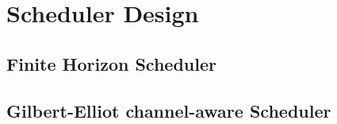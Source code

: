 \chapter{Scheduler Design}

\section{Finite Horizon Scheduler}

\section{Gilbert-Elliot channel-aware Scheduler}
